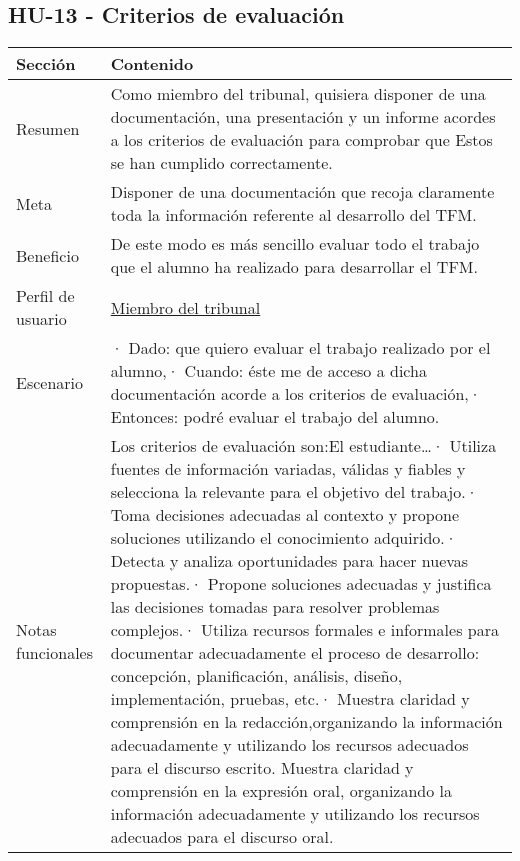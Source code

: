 \subsection{HU-13 - Criterios de evaluación}
\label{sec:hu13}

\begin{table}[H]
    \centering
    \def\arraystretch{1.25}
    \begin{adjustbox}{max width=\textwidth}
    \begin{tabularx}{\textwidth}{|l|L|}
    \hline
        \textbf{Sección} & \textbf{Contenido} \\ \hline
    \hline
        Resumen & Como miembro del tribunal, quisiera disponer de una documentación, una presentación y un informe acordes a los criterios de evaluación para comprobar que Estos se han cumplido correctamente. \\ \hline
        Meta & Disponer de una documentación que recoja claramente toda la información referente al desarrollo del TFM. \\ \hline
        Beneficio & De este modo es más sencillo evaluar todo el trabajo que el alumno ha realizado para desarrollar el TFM. \\ \hline
        Perfil de usuario & \hyperref[sec:personaMiembroTribunal]{Miembro del tribunal} \\ \hline
        Escenario & · Dado: que quiero evaluar el trabajo realizado por el alumno,\linebreak · Cuando: éste me de acceso a dicha documentación acorde a los criterios de evaluación,\linebreak · Entonces: podré evaluar el trabajo del alumno. \\ \hline
        Notas funcionales & Los criterios de evaluación son:\linebreak \linebreak El estudiante…\linebreak · Utiliza fuentes de información variadas, válidas y fiables y selecciona la relevante para el objetivo del trabajo.\linebreak · Toma decisiones adecuadas al contexto y propone soluciones utilizando el conocimiento adquirido.\linebreak · Detecta y analiza oportunidades para hacer nuevas propuestas.\linebreak · Propone soluciones adecuadas y justifica las decisiones tomadas para resolver problemas complejos.\linebreak · Utiliza recursos formales e informales para documentar adecuadamente el proceso de desarrollo: concepción, planificación, análisis, diseño, implementación, pruebas, etc.\linebreak · Muestra claridad y comprensión en la redacción,organizando la información adecuadamente y utilizando los recursos adecuados para el discurso escrito. Muestra claridad y comprensión en la expresión oral, organizando la información adecuadamente y utilizando los recursos adecuados para el discurso oral. \\ \hline

\end{tabularx}
\end{adjustbox}
\end{table}
